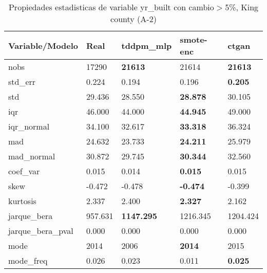 \begin{table}[H]
\centering
\fontsize{8}{14}\selectfont
\caption{Propiedades estadisticas de variable yr\_built con cambio\ensuremath{>}5\%, King county (A-2)}
\label{table-stats-king county-a-2-yr_built-short}
\begin{tabular}{|l|m{10em}|m{10em}|m{10em}|m{10em}|}
\hline
 \rowcolor[gray]{0.8}
Variable/Modelo & Real & tddpm\_mlp & smote-enc & ctgan \\
\hline nobs & 17290 & \bfseries 21613 & \cellcolor[rgb]{0.9, 0.54, 0.52} 21614 & \bfseries 21613 \\
\hline std\_err & 0.224 & \cellcolor[rgb]{0.9, 0.54, 0.52} 0.194 & 0.196 & \bfseries 0.205 \\
\hline std & 29.436 & \cellcolor[rgb]{0.9, 0.54, 0.52} 28.550 & \bfseries 28.878 & 30.105 \\
\hline iqr & 46.000 & 44.000 & \bfseries 44.945 & \cellcolor[rgb]{0.9, 0.54, 0.52} 49.000 \\
\hline iqr\_normal & 34.100 & 32.617 & \bfseries 33.318 & \cellcolor[rgb]{0.9, 0.54, 0.52} 36.324 \\
\hline mad & 24.632 & 23.733 & \bfseries 24.211 & \cellcolor[rgb]{0.9, 0.54, 0.52} 25.979 \\
\hline mad\_normal & 30.872 & 29.745 & \bfseries 30.344 & \cellcolor[rgb]{0.9, 0.54, 0.52} 32.560 \\
\hline coef\_var & 0.015 & \cellcolor[rgb]{0.9, 0.54, 0.52} 0.014 & \bfseries 0.015 & 0.015 \\
\hline skew & -0.472 & -0.478 & \bfseries -0.474 & \cellcolor[rgb]{0.9, 0.54, 0.52} -0.399 \\
\hline kurtosis & 2.337 & 2.400 & \bfseries 2.327 & \cellcolor[rgb]{0.9, 0.54, 0.52} 2.162 \\
\hline jarque\_bera & 957.631 & \bfseries 1147.295 & \cellcolor[rgb]{0.9, 0.54, 0.52} 1216.345 & 1204.424 \\
\hline jarque\_bera\_pval & 0.000 & 0.000 & 0.000 & 0.000 \\
\hline mode & 2014 & \cellcolor[rgb]{0.9, 0.54, 0.52} 2006 & \bfseries 2014 & 2015 \\
\hline mode\_freq & 0.026 & 0.023 & \cellcolor[rgb]{0.9, 0.54, 0.52} 0.011 & \bfseries 0.025 \\
\hline
\end{tabular}
\end{table}
